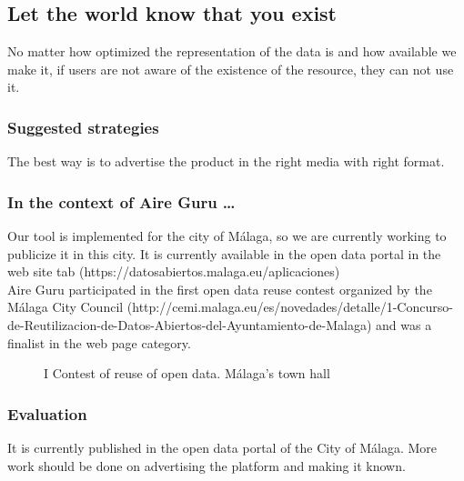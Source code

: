 \subsection{Let the world know that you exist}

No matter how optimized the representation of the data is and how available we make it, if users are not aware
of the existence of the resource, they can not use it.

\subsubsection*{Suggested strategies} 

The best way is to advertise the product in the right media with right format.

\subsubsection*{In the context of Aire Guru \ldots}

Our tool is implemented for the city of Málaga, so we are currently working to publicize it in this city.
It is currently available in the open data portal in the web site tab (https://datosabiertos.malaga.eu/aplicaciones) \\
Aire Guru participated in the first open data reuse contest organized by the Málaga City Council (http://cemi.malaga.eu/es/novedades/detalle/1-Concurso-de-Reutilizacion-de-Datos-Abiertos-del-Ayuntamiento-de-Malaga)
and was a finalist in the web page category.

\begin{figure}[ht]
    \centering
   \hfill
 
    \caption{I Contest of reuse of open data. Málaga's town hall}
    \end{figure}

\subsubsection*{Evaluation}  

\begin{itemize}
    \done It is currently published in the open data portal of the City of Málaga.
    \crossed More work should be done on advertising the platform and making it known.
\end{itemize}